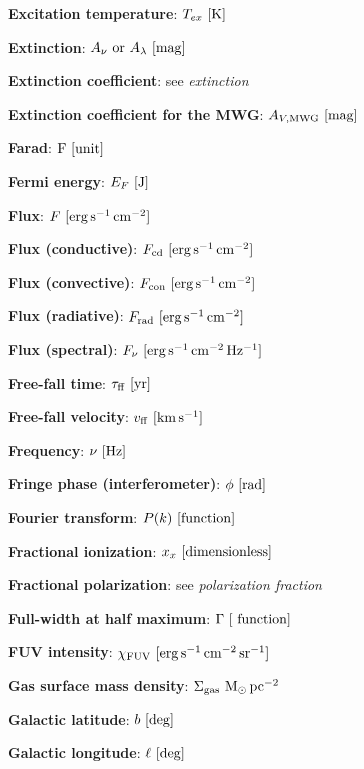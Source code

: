 \documentclass[a4paper,10pt]{article}
\begin{document}
{\noindent}\textbf{Excitation temperature}: $T_{ex} ~ [{\rm K}]$

{\noindent}\textbf{Extinction}: $A_\nu~{\rm or}~A_\lambda ~ [{\rm mag}]$

{\noindent}\textbf{Extinction coefficient}: see \textit{extinction}

{\noindent}\textbf{Extinction coefficient for the MWG}: $A_{V,\mathrm{MWG}} ~ [{\rm mag}]$

{\noindent}\textbf{Farad}: ${\rm F} ~ [{\rm unit}]$

{\noindent}\textbf{Fermi energy}: $E_F ~ [{\rm J}]$

{\noindent}\textbf{Flux}: $F ~ [{\rm erg\,s^{-1}\,cm^{-2}}]$

{\noindent}\textbf{Flux (conductive)}: $F_{\rm cd} ~ [{\rm erg\,s^{-1}\,cm^{-2}}]$

{\noindent}\textbf{Flux (convective)}: $F_{\rm con} ~ [{\rm erg\,s^{-1}\,cm^{-2}}]$

{\noindent}\textbf{Flux (radiative)}: $F_{\rm rad} ~ [{\rm erg\,s^{-1}\,cm^{-2}}]$

{\noindent}\textbf{Flux (spectral)}: $F_\nu ~ [{\rm erg\,s^{-1}\,cm^{-2}\,Hz^{-1}}]$

{\noindent}\textbf{Free-fall time}: $\tau_{\rm ff} ~ [{\rm yr}]$

{\noindent}\textbf{Free-fall velocity}: $v_{\rm ff} ~ [{\rm km\,s^{-1}}]$

{\noindent}\textbf{Frequency}: $\nu ~ [{\rm Hz}]$

{\noindent}\textbf{Fringe phase (interferometer)}: $\phi ~ [{\rm rad}]$

{\noindent}\textbf{Fourier transform}: $P(k) ~ [{\rm function}]$

{\noindent}\textbf{Fractional ionization}: $x_x ~ [{\rm dimensionless}]$

{\noindent}\textbf{Fractional polarization}: see \textit{polarization fraction}

{\noindent}\textbf{Full-width at half maximum}: $\Gamma ~ [{\rm ~ function}]$

{\noindent}\textbf{FUV intensity}: $\chi_{\rm FUV} ~ [{\rm erg\,s^{-1}\,cm^{-2}\,sr^{-1}}]$

{\noindent}\textbf{Gas surface mass density}: $\Sigma_\mathrm{gas} ~ {\rm M_\odot\,pc^{-2}}$

{\noindent}\textbf{Galactic latitude}: $b ~ [{\rm deg}]$

{\noindent}\textbf{Galactic longitude}: $\ell ~ [{\rm deg}]$
\end{document}
